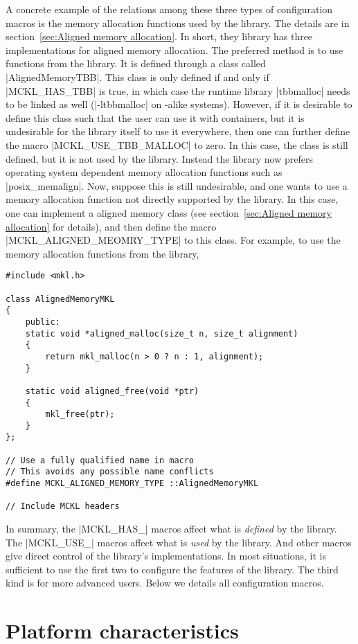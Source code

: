 A concrete example of the relations among these three types of configuration
macros is the memory allocation functions used by the library. The details are
in section~\ref{sec:Aligned memory allocation}. In short, they library has
three implementations for aligned memory allocation. The preferred method is to
use functions from the \tbb library. It is defined through a class called
|AlignedMemoryTBB|. This class is only defined if and only if |MCKL_HAS_TBB| is
true, in which case the runtime library |tbbmalloc| needs to be linked as well
(|-ltbbmalloc| on \unix-alike systems). However, if it is desirable to define
this class such that the user can use it with \stl containers, but it is
undesirable for the library itself to use it everywhere, then one can further
define the macro |MCKL_USE_TBB_MALLOC| to zero. In this case, the class is
still defined, but it is not used by the library. Instead the library now
prefers operating system dependent memory allocation functions such as
|posix_memalign|. Now, suppose this is still undesirable, and one wants to use
a memory allocation function not directly supported by the library. In this
case, one can implement a aligned memory class (see section~\ref{sec:Aligned
memory allocation} for details), and then define the macro
|MCKL_ALIGNED_MEOMRY_TYPE| to this class. For example, to use the memory
allocation functions from the \mkl library,
\begin{verbatim}
#include <mkl.h>

class AlignedMemoryMKL
{
    public:
    static void *aligned_malloc(size_t n, size_t alignment)
    {
        return mkl_malloc(n > 0 ? n : 1, alignment);
    }

    static void aligned_free(void *ptr)
    {
        mkl_free(ptr);
    }
};

// Use a fully qualified name in macro
// This avoids any possible name conflicts
#define MCKL_ALIGNED_MEMORY_TYPE ::AlignedMemoryMKL

// Include MCKL headers
\end{verbatim}
In summary, the |MCKL_HAS_| macros affect what is \emph{defined} by the
library. The |MCKL_USE_| macros affect what is \emph{used} by the library. And
other macros give direct control of the library's implementations. In most
situations, it is sufficient to use the first two to configure the features of
the library. The third kind is for more advanced users. Below we details all
configuration macros.

\section{Platform characteristics}
\label{sec:Platform characteristics}

